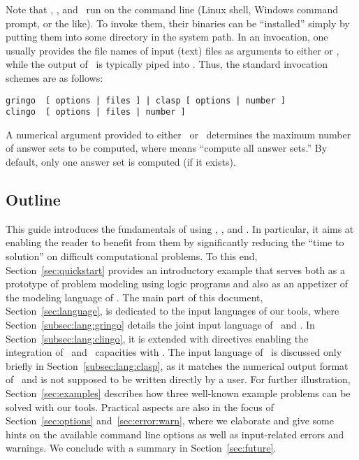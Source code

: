 Note that \gringo, \clasp, and \clingo\ 
run on the command line (Linux shell, Windows command prompt, or the like).
To invoke them, their binaries can be ``installed''
simply by putting them into some directory in the system path.
In an invocation,
one usually provides the file names of input (text) files 
as arguments to either \gringo or \clingo,
while the output of \gringo\ is typically piped into \clasp.
Thus, the standard invocation schemes are as follows:
\begin{lstlisting}[numbers=none]
gringo  [ options | files ] | clasp [ options | number ]
clingo  [ options | files | number ]
\end{lstlisting}
A numerical argument provided to either \clasp\ or \clingo\
determines the maximum number of answer sets to be computed,
where \code{0} means ``compute all answer sets.''
By default, only one answer set is computed (if it exists).

\subsection{Outline}

This guide introduces the fundamentals of using
\gringo, \clasp, and \clingo.
In particular, it aims at enabling the reader to benefit from them
by significantly reducing the ``time to solution'' on difficult computational problems.
To this end,
Section~\ref{sec:quickstart}
provides an introductory example 
that serves both as a prototype of problem modeling using logic programs
and also as an appetizer of the modeling language of \gringo.
The main part of this document, Section~\ref{sec:language},
is dedicated to the input languages of our tools,
where Section~\ref{subsec:lang:gringo}
details the joint input language of \gringo\ and \clingo.
In Section~\ref{subsec:lang:clingo}, it is extended with
directives enabling the integration of \python\ and \lua\ capacities with \clingo.
The input language of \clasp\ is discussed only briefly in Section~\ref{subsec:lang:clasp},
as it matches the numerical output format of \gringo\ and
is not supposed to be written directly by a user.
For %
further illustration,
Section~\ref{sec:examples} describes how three well-known example problems
can be solved with our tools.
Practical aspects are also in the focus of Section~\ref{sec:options} and~\ref{sec:error:warn},
where we elaborate and give some hints on the available command line options
as well as input-related errors and warnings. %
We conclude with a summary in Section~\ref{sec:future}.

